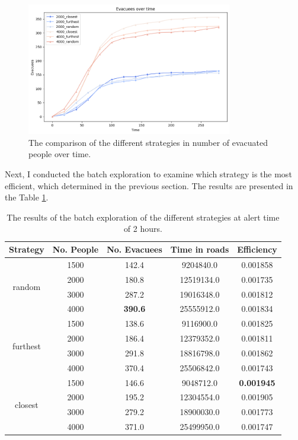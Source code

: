 \documentclass[12pt]{article}
\begin{document}
\begin{figure}
    \centering
    \includegraphics[width=0.8\textwidth]{../images/evacuees_over_time.png}
    \caption{The comparison of the different strategies in number of evacuated people over time.}
    \label{fig:evacuees_over_time}
\end{figure}

Next, I conducted the batch exploration to examine which strategy is the most efficient, which determined in the previous section. The results are presented in the Table \ref{tab:batch}.

\begin{table}[h!]
\centering
\begin{tabular}{|c|c|c|c|c|}
\hline
\textbf{Strategy} & \textbf{No. People} & \textbf{No. Evacuees} & \textbf{Time in roads} & \textbf{Efficiency} \\ \hline
\multirow{4}{*}{random}   & 1500 & 142.4 & 9204840.0  & 0.001858 \\ \cline{2-5} 
                            & 2000 & 180.8 & 12519134.0 & 0.001735 \\ \cline{2-5} 
                            & 3000 & 287.2 & 19016348.0 & 0.001812 \\ \cline{2-5} 
                            & 4000 & \textbf{390.6} & 25555912.0 & 0.001834 \\ \hline
\multirow{4}{*}{furthest} & 1500 & 138.6 & 9116900.0  & 0.001825 \\ \cline{2-5} 
                            & 2000 & 186.4 & 12379352.0 & 0.001811 \\ \cline{2-5} 
                            & 3000 & 291.8 & 18816798.0 & 0.001862 \\ \cline{2-5} 
                            & 4000 & 370.4 & 25506842.0 & 0.001743 \\ \hline
\multirow{4}{*}{closest}  & 1500 & 146.6 & 9048712.0  & \textbf{0.001945} \\ \cline{2-5} 
                            & 2000 & 195.2 & 12304554.0 & 0.001905 \\ \cline{2-5} 
                            & 3000 & 279.2 & 18900030.0 & 0.001773 \\ \cline{2-5} 
                            & 4000 & 371.0 & 25499950.0 & 0.001747 \\ \hline
\end{tabular}
\caption{The results of the batch exploration of the different strategies at alert time of 2 hours.}
\label{tab:batch}
\end{table}
\end{document}
